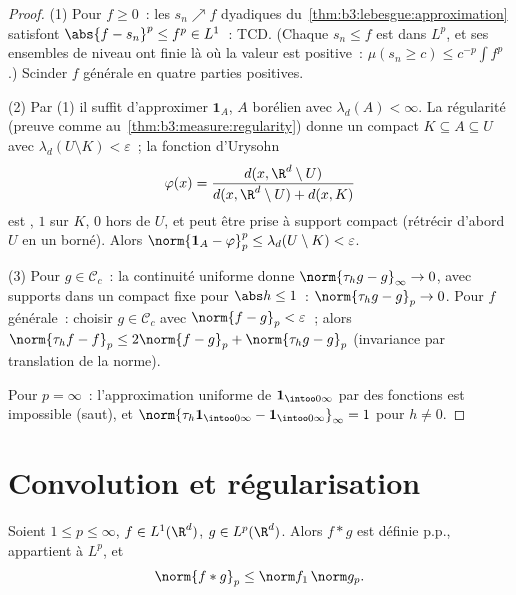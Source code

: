 \begin{proof}
(1) Pour $f \geq 0$~: les $s_n \nearrow f$ dyadiques
du~\cref{thm:b3:lebesgue:approximation} satisfont $\abs{f -
s_n}^p \leq f^p \in L^1$~: TCD. (Chaque $s_n \leq f$ est dans
$L^p$, et ses ensembles de niveau ont  finie là où la
valeur est positive~: $\mu(s_n \geq c) \leq c^{-p}\int f^p$.)
Scinder $f$ générale en quatre parties positives.

(2) Par (1) il suffit d'approximer $\mathbf 1_A$, $A$ borélien
avec $\lambda_d(A) < \infty$. La régularité (preuve comme
au~\cref{thm:b3:measure:regularity}) donne un compact $K
\subseteq A \subseteq U$  avec $\lambda_d(U\setminus K)
< \varepsilon$~; la fonction d'Urysohn
\[
\varphi(x) = \frac{d(x, \R^d\setminus U)}{d(x, \R^d\setminus U)
+ d(x, K)}
\]
est , $1$ sur $K$, $0$ hors de $U$, et peut être
prise à support compact (rétrécir d'abord $U$ en un 
borné). Alors $\norm{\mathbf 1_A - \varphi}_p^p \leq
\lambda_d(U\setminus K) < \varepsilon$.

(3) Pour $g \in \mathcal C_c$~: la continuité uniforme donne
$\norm{\tau_hg - g}_\infty \to 0$, avec supports dans un
compact fixe pour $\abs h \leq 1$~: $\norm{\tau_hg - g}_p \to
0$. Pour $f$ générale~: choisir $g \in \mathcal C_c$ avec
$\norm{f - g}_p < \varepsilon$~; alors $\norm{\tau_hf -
f}_p \leq 2\norm{f - g}_p + \norm{\tau_hg - g}_p$
(invariance par translation de la norme).

Pour $p = \infty$~: l'approximation uniforme de $\mathbf
1_{\intoo0\infty}$ par des fonctions  est impossible
(saut), et $\norm{\tau_h\mathbf 1_{\intoo0\infty} - \mathbf
1_{\intoo0\infty}}_\infty = 1$ pour $h \neq 0$.
\end{proof}

\section{Convolution et régularisation}

\begin{theorem}\label{thm:b3:lp:young}
Soient $1 \leq p \leq \infty$, $f \in L^1(\R^d)$, $g \in
L^p(\R^d)$. Alors $f * g$ est définie p.p., appartient à
$L^p$, et
\[
\norm{f * g}_p \leq \norm f_1\,\norm g_p .
\]
\end{theorem}

